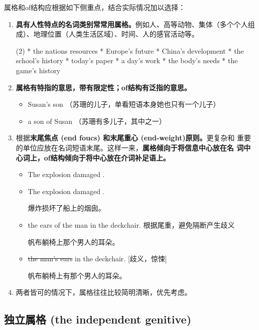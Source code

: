 属格和of结构应根据如下侧重点，结合实际情况加以选择：
\begin{enumerate}
\item \textbf{具有人性特点的名词类别常常用属格。}例如人、高等动物、集体（多个个人组
  成）、地理位置（人类生活区域）、时间、人的感官活动等。
  \begin{taskitem}(2)
    * the nations resources
    * Europe's future
    * China's development
    * the school's history
    * today's paper
    * a day's work
    * the body's needs
    * the game's history
  \end{taskitem}

\item \textbf{属格有特指的意思，带有限定性；of结构有泛指的意思。}
  \begin{itemize}
  \item Susan's son （苏珊的儿子，单看短语本身她也只有一个儿子）

  \item a son of Susan （苏珊有多儿子，其中之一）
  \end{itemize}

\item 根据\textbf{末尾焦点 (end foucs) 和末尾重心 (end-weight)原则。}更复杂和
  重要的单位应放在名词短语末尾。这样一来，\textbf{属格倾向于将信息中心放在名
    词中心词上，of结构倾向于将中心放在介词补足语上。}

  \begin{itemize}
  \item The explosion damaged .
  \item The explosion damaged .

    爆炸损坏了船上的烟囱。

  \item the ears of the man in the deckchair. 根据尾重，避免隔断产生歧义

    帆布躺椅上那个男人的耳朵。
  \item \sout{the man's ears} in the deckchair. [歧义，惊悚]

    帆布躺椅上有那个男人的耳朵。
  \end{itemize}

\item 两者皆可的情况下，属格往往比较简明清晰，优先考虑。
\end{enumerate}


\subsection{独立属格 (the independent genitive)}

